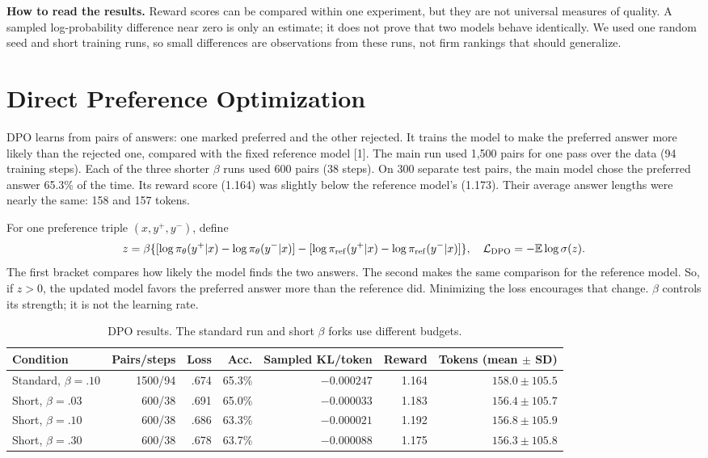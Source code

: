 \documentclass[10pt]{article}
\begin{document}
\textbf{How to read the results.} Reward scores can be compared within one experiment, but they are not universal measures of quality. A sampled log-probability difference near zero is only an estimate; it does not prove that two models behave identically. We used one random seed and short training runs, so small differences are observations from these runs, not firm rankings that should generalize.

\section{Direct Preference Optimization}
DPO learns from pairs of answers: one marked preferred and the other rejected. It trains the model to make the preferred answer more likely than the rejected one, compared with the fixed reference model [1]. The main run used 1,500 pairs for one pass over the data (94 training steps). Each of the three shorter $\beta$ runs used 600 pairs (38 steps). On 300 separate test pairs, the main model chose the preferred answer 65.3\% of the time. Its reward score (1.164) was slightly below the reference model's (1.173). Their average answer lengths were nearly the same: 158 and 157 tokens.

For one preference triple $(x,y^+,y^-)$, define
\begin{equation}
z=\beta\{[\log\pi_\theta(y^+|x)-\log\pi_\theta(y^-|x)]-[\log\pi_{\rm ref}(y^+|x)-\log\pi_{\rm ref}(y^-|x)]\},\quad
\mathcal{L}_{\rm DPO}=-\mathbb{E}\log\sigma(z).\label{eq:dpo}
\end{equation}
The first bracket compares how likely the model finds the two answers. The second makes the same comparison for the reference model. So, if $z>0$, the updated model favors the preferred answer more than the reference did. Minimizing the loss encourages that change. $\beta$ controls its strength; it is not the learning rate.

\begin{table}[h]
\centering\scriptsize
\caption{DPO results. The standard run and short $\beta$ forks use different budgets.}
\begin{tabular}{lrrrrrr}
\toprule
Condition & Pairs/steps & Loss & Acc. & Sampled KL/token & Reward & Tokens (mean $\pm$ SD) \\
\midrule
Standard, $\beta=.10$ & 1500/94 & .674 & 65.3\% & $-0.000247$ & 1.164 & $158.0\pm105.5$ \\
Short, $\beta=.03$ & 600/38 & .691 & 65.0\% & $-0.000033$ & 1.183 & $156.4\pm105.7$ \\
Short, $\beta=.10$ & 600/38 & .686 & 63.3\% & $-0.000021$ & 1.192 & $156.8\pm105.9$ \\
Short, $\beta=.30$ & 600/38 & .678 & 63.7\% & $-0.000088$ & 1.175 & $156.3\pm105.8$ \\
\bottomrule
\end{tabular}
\end{table}
\end{document}
